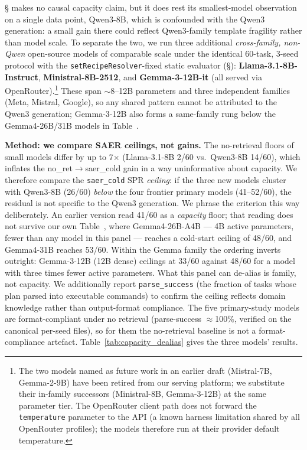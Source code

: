 \documentclass[letterpaper]{article} %
\newcommand{\bodyref}[1]{\getrefnumber{#1}}
\begin{document}
\S\bodyref{sec:mainresults} makes no causal capacity claim, but it does rest
its smallest-model observation on a single data point, Qwen3-8B, which is
confounded with the Qwen3 generation: a small gain there could reflect
Qwen3-family template fragility rather than model scale.  To separate the
two, we
run three additional \emph{cross-family, non-Qwen} open-source models
of comparable scale under the identical 60-task, 3-seed protocol with
the \texttt{setRecipeResolver}-fixed static evaluator (\S\bodyref{sec:protocol}):
\textbf{Llama-3.1-8B-Instruct}, \textbf{Ministral-8B-2512}, and
\textbf{Gemma-3-12B-it} (all served via OpenRouter).\footnote{The
two models named as future work in an earlier draft (Mistral-7B,
Gemma-2-9B) have been retired from our serving platform; we substitute
their in-family successors (Ministral-8B, Gemma-3-12B) at the same
parameter tier. The OpenRouter client path does not forward the
\texttt{temperature} parameter to the API (a known harness limitation
shared by all OpenRouter profiles); the models therefore run at their
provider default temperature.}  These span $\sim$8--12B parameters and
three independent families (Meta, Mistral, Google), so any shared
pattern cannot be attributed to the Qwen3 generation; Gemma-3-12B also
forms a same-family rung below the Gemma4-26B/31B models in Table~\bodyref{tab:main}.

\textbf{Method: we compare SAER ceilings, not gains.}  The
no-retrieval floors of small models differ by up to 7$\times$
(Llama-3.1-8B 2/60 vs.\ Qwen3-8B 14/60), which inflates the
no\_ret$\to$saer\_cold gain in a way uninformative about capacity.
We therefore compare the \texttt{saer\_cold} SPR \emph{ceiling}: if the
three new models cluster with Qwen3-8B (26/60) \emph{below} the four frontier primary models (41--52/60), the residual is not specific to the Qwen3
generation.  We phrase the criterion this way deliberately.  An earlier
version read 41/60 as a \emph{capacity} floor; that reading does not
survive our own Table~\bodyref{tab:main}, where Gemma4-26B-A4B --- 4B active
parameters, fewer than any model in this panel --- reaches a cold-start
ceiling of 48/60, and Gemma4-31B reaches 53/60.  Within the Gemma family
the ordering inverts outright: Gemma-3-12B (12B dense) ceilings at
33/60 against 48/60 for a model with three times fewer active
parameters.  What this panel can de-alias is family, not capacity.  We additionally report \texttt{parse\_success}
(the fraction of tasks whose plan parsed into executable commands) to
confirm the ceiling reflects domain knowledge rather than
output-format compliance.  The five primary-study models are
format-compliant under no retrieval (parse-success $\approx$100\%, verified on
the canonical per-seed files), so for them the no-retrieval baseline is not a
format-compliance artefact.  Table~\ref{tab:capacity_dealias} gives the three models'
results.
\end{document}
